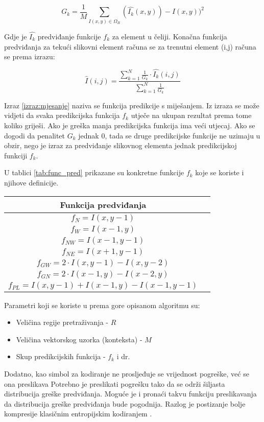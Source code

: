\documentclass[times, utf8, zavrsni, numeric, sort]{fer}
\begin{document}
\begin{equation}
\label{izraz:kazna}
G_{k} = \frac{1}{M}\sum_{I(x,y)\in\Omega_{B}} (\hat{I_{k}}(x,y))-I(x,y))^{2}
\end{equation}

Gdje je $\hat{I_{k}}$ predviđanje funkcije $f_{k}$ za element u čeliji. Konačna funkcija predviđanja za tekući slikovni element računa se za trenutni element (i,j) računa se prema izrazu:

\begin{equation}
\label{izraz:mjesanje}
\hat{I}(i,j) = \frac{\sum_{k=1}^{N}\frac{1}{G_{k}}\cdot \hat{I_{k}} (i,j)}{\sum_{k=1}^{N}\frac{1}{G_{k}}}
\end{equation}

Izraz \ref{izraz:mjesanje} naziva se funkcija predikcije s miješanjem. Iz izraza se može vidjeti da svaka predikcijska funkcija $f_{k}$ utječe na ukupan rezultat prema tome koliko griješi. Ako je greška manja predikcijska funkcija ima veći utjecaj. Ako se dogodi da penalitet $G_{k}$ jednak 0, tada se druge predikcijske funkcije ne uzimaju u obzir, nego je izraz za predviđanje slikovnog elementa jednak predikcijskoj funkciji $f_{k}$.

U tablici \ref{tab:func_pred} prikazane su konkretne funkcije $f_{k}$ koje se koriste i njihove definicije.

\begin{center}
 \label{tab:func_pred}
\begin{tabular}{| c | c |}
\hline
Funkcija predviđanja
\\
\hline
$f_{N}=I(x,y-1)$
\\
\hline
$f_{W}=I(x-1,y)$
\\
\hline
$f_{NW}=I(x-1,y-1)$
\\
\hline
$f_{NE}=I(x+1,y-1)$
\\
\hline
$f_{GW}=2\cdot I(x,y-1) - I(x,y-2)$
\\
\hline
$f_{GN}=2\cdot I(x-1,y) - I(x-2,y)$
\\
\hline
$f_{PL}=I(x,y-1)+I(x-1,y)-I(x-1,y-1)$
\\
\hline
\end{tabular}
\end{center}

Parametri koji se koriste u prema gore opisanom algoritmu su:
\begin{itemize}
\item Veličina regije pretraživanja - $R$
\item Veličina vektorskog uzorka (konteksta) - $M$
\item Skup predikcijskih funkcija - $f_{k}$ i dr.
\end{itemize}
Dodatno, kao simbol za kodiranje ne prosljeđuje se vrijednost pogreške, već se ona preslikava Potrebno je preslikati pogrešku tako da se održi šiljasta distribucija greške predviđanja. Moguće je i pronaći takvu funkciju preslikavanja da distribucija greške predviđanja bude pogodnija. Razlog je postizanje bolje kompresije klasičnim entropijskim kodiranjem \cite{Knezovic:06}.
\end{document}
